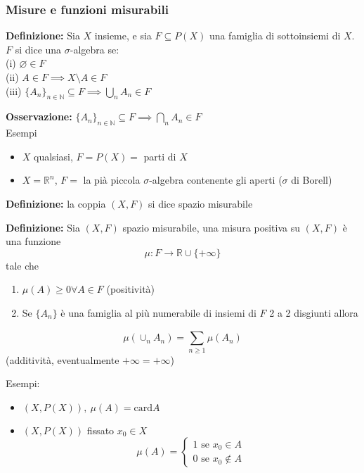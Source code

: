 \documentclass[a4paper]{article}
\newcommand{\R}{\mathbb{R}}
\newcommand{\N}{\mathbb{N}}
\begin{document}
\subsubsection{Misure e funzioni misurabili}
\begin{tcolorbox}
	\textbf{Definizione:} Sia $X$ insieme, e sia $F\subseteq P(X)$ una famiglia di sottoinsiemi di $X$.
	\\$F$ si dice una $\sigma$-algebra se:
	\\(i) $\varnothing\in F$
	\\(ii) $A\in F\implies X\setminus A\in F$
	\\(iii) $\{A_n\} _{n \in \N}\subseteq F\implies \bigcup_{n}A_n\in F$
\end{tcolorbox}
\textbf{Osservazione:} $\{A_n\} _{n\in\N}\subseteq F\implies \bigcap_n A_n \in F$
\\Esempi
\begin{itemize}
	\item $X$ qualsiasi, $F=P(X)=$ parti di $X$
	\item $X=\R^n$, $F=$ la pià piccola $\sigma$-algebra contenente gli aperti ($\sigma$ di Borell) 
\end{itemize}
\begin{tcolorbox}
	\textbf{Definizione: } la coppia $(X,F)$ si dice spazio misurabile

\end{tcolorbox}
\begin{tcolorbox}
	\textbf{Definizione:} Sia $(X,F)$ spazio misurabile, una misura positiva su $(X,F) $ è una funzione
\[\mu:F\to \R\cup \{+\infty\} \] 
tale che
\begin{enumerate}
	\item $\mu(A)\ge 0\forall A\in F$ (positività)
	\item Se $\{A_n\} $ è una famiglia al più numerabile di insiemi di $F$ 2 a 2 disgiunti allora 
\end{enumerate}
\[\mu(\cup _n A_n)=\sum_{n\ge 1}^{} \mu(A_n)\]
(additività, eventualmente $+\infty=+\infty$)
\end{tcolorbox}
Esempi:
\begin{itemize}
\item $(X,P(X)),\ \mu(A)=\text{card}A$
\item $(X,P(X))$ fissato $x_0\in X$
	\[\mu(A)=\begin{cases}
		1\text{  se }x_0\in A\\
		0\text{  se }x_0\not\in A
	\end{cases}\]
\end{itemize}
\end{document}
